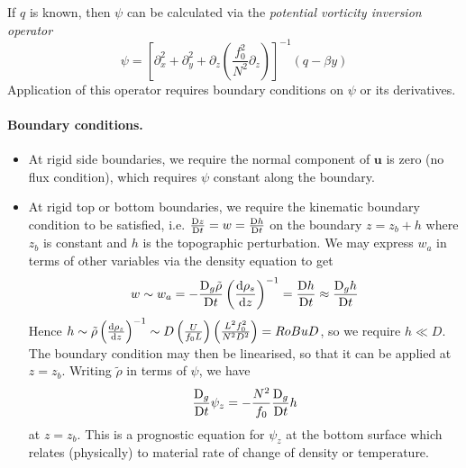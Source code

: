 \documentclass{jknotes}
\begin{document}
If $q$ is known, then $\psi$ can be calculated via the \emph{potential
vorticity inversion operator}
\begin{equation}
	\psi = \left[\partial_x^2 + \partial_y^2 + \partial_z
	\left(\frac{f_0^2}{N^2} \partial_z\right)\right]^{-1} (q-\beta y)
\end{equation}
Application of this operator requires boundary conditions on $\psi$ or its
derivatives.

\paragraph{Boundary conditions.}
\begin{itemize}
	\item At rigid side boundaries, we require the normal component of $\symbf{u}$ is
		zero (no flux condition), which requires $\psi$ constant along the
		boundary.
	\item At rigid top or bottom boundaries, we require the kinematic boundary
		condition to be satisfied, i.e. $\frac{\mathrm{D} z}{\mathrm{D} t} = w =
		\frac{\mathrm{D} h}{\mathrm{D} t}$ on the boundary $z = z_b +h$ where $z_b$ is
		constant and $h$ is the topographic perturbation. We may express $w_a$
		in terms of other variables via the density equation to get
		\begin{equation}
			w \sim w_a = -\frac{\diffD_g \tilde{\rho}}{\diffD t}
			\left(\frac{\diffd \rho_s}{\diffd z}\right)^{-1} = \frac{\diffD
			h}{\diffD t} \approx \frac{\diffD_g h}{\diffD t}
		\end{equation}
		Hence $h \sim \tilde{\rho}\left(\frac{\diffd \rho_s}{\diffd
		z}\right)^{-1} \sim D \left( \frac{U}{f_0 L}\right) \left(\frac{L^2
		f_0^2}{N^2 D^2}\right) = \Ro \Bu D$, so we require $h \ll D$. The
		boundary condition may then be linearised, so that it can be applied
		at $z = z_b$.  Writing $\tilde{\rho}$ in terms of $\psi$, we have
		\begin{equation} 
			\frac{\mathrm{D}_g}{\mathrm{D} t} \psi_z = -\frac{N^2}{f_0}
			\frac{\mathrm{D}_g}{\mathrm{D} t} h 
		\end{equation} 
		at $z = z_b$. This is a prognostic equation for $\psi_z$ at the bottom
		surface which relates (physically) to material rate of change of
		density or temperature.
\end{itemize}
\end{document}
